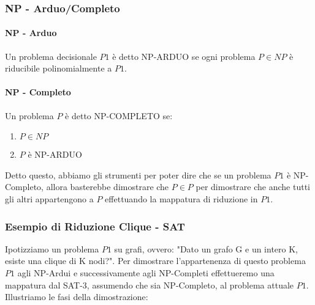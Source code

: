 \documentclass{article}
\begin{document}
\subsubsection{NP - Arduo/Completo} 

\paragraph{NP - Arduo}

Un problema decisionale $P1$ è detto NP-ARDUO se ogni problema $P \in NP$ è riducibile polinomialmente a $P1$.

\paragraph{NP - Completo}

Un problema $P$ è detto NP-COMPLETO se:

\begin{enumerate}
    \item $P \in NP$
    \item $P$ è NP-ARDUO
\end{enumerate}

Detto questo, abbiamo gli strumenti per poter dire che se un problema $P1$ è NP-Completo, allora basterebbe dimostrare che $P \in P$ per dimostrare che anche tutti gli altri appartengono a $P$ effettuando la mappatura di riduzione in $P1$.

\vskip 1.5cm


\subsubsection{Esempio di Riduzione Clique - SAT}

Ipotizziamo un problema $P1$ su grafi, ovvero: "Dato un grafo G e un intero K, esiste una clique di K nodi?". Per dimostrare l'appartenenza di questo problema $P1$ agli NP-Ardui e successivamente agli NP-Completi effettueremo una mappatura dal SAT-3, assumendo che sia NP-Completo, al problema attuale $P1$.
Illustriamo le fasi della dimostrazione:

\newpage
\end{document}
